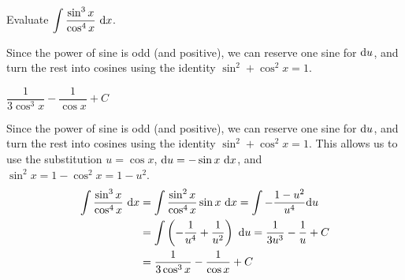 \begin{Mquestion}
Evaluate $\displaystyle\int \dfrac{\sin^3 x}{\cos^4 x} ~\mathrm{d}x$.
\end{Mquestion}
\begin{hint}
Since the power of sine is odd (and positive), we can reserve one sine for $\mathrm{d}u$, and turn the rest into cosines using the identity $\sin^2  + \cos^2 x =1$.
\end{hint}
\begin{answer}
$\dfrac{1}{3\cos^3 x} - \dfrac{1}{\cos x}+C$
\end{answer}
\begin{solution}
Since the power of sine is odd (and positive), we can reserve one sine for $\mathrm{d}u$, and turn the rest into cosines using the identity $\sin^2  + \cos^2 x =1$. This allows us to use the substitution $u=\cos x$, $\mathrm{d}u=-\sin x~\mathrm{d}x$, and $\sin^2 x = 1-\cos^2 x = 1-u^2$.
\begin{align*}
\int \dfrac{\sin^3 x}{\cos ^4 x} ~\mathrm{d}x&=\int \frac{\sin^2 x}{\cos^4 x}\sin x~\mathrm{d}x
=\int -\frac{1-u^2}{u^4}\mathrm{d}u\\
&=\int\left( -\frac{1}{u^{4}}+\frac{1}{u^{2}}\right)~\mathrm{d}u = \frac{1}{3u^3}-\frac{1}{u}+C\\
&=\frac{1}{3\cos^3 x} - \frac{1}{\cos x}+C
\end{align*}
\end{solution}

